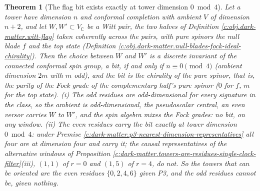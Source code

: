 \documentclass[11pt]{article}
\newtheorem{theorem}{Theorem}[section]
\theoremstyle{definition}
\theoremstyle{plain}
\providecommand{\C}{}\renewcommand{\C}{\mathbb{C}}
\begin{document}
\begin{theorem}[The flag bit exists exactly at tower dimension $0 \bmod 4$]\label{c:dark-matter.flag-bit-exists-exactly-tower-dimension}
Let a tower have dimension $n$ and conformal completion with ambient $V$ of dimension $n + 2$, and let $W, W' \subset V_{\C}$ be a Witt pair, the two halves of Definition \ref{c:obj.dark-matter.witt-flag} taken coherently across the pairs, with pure spinors the null blade $f$ and the top state (Definition \ref{c:obj.dark-matter.null-blades-fock-ideal-chirality}). Then the choice between $W$ and $W'$ is a discrete invariant of the connected conformal spin group, a \emph{bit}, if and only if $n \equiv 0 \pmod 4$ (ambient dimension $2m$ with $m$ odd), and the bit is the chirality of the pure spinor, that is, the parity of the Fock grade of the complementary half's pure spinor ($0$ for $f$, $m$ for the top state). (i) The odd residues are odd-dimensional for every signature in the class, so the ambient is odd-dimensional, the pseudoscalar central, an even versor carries $W$ to $W'$, and the spin algebra mixes the Fock grades: no bit, on any window. (ii) The even residues carry the bit exactly at tower dimension $0 \bmod 4$: under Premise \ref{c:dark-matter.p3-nearest-dimension-representatives} all four are at dimension four and carry it; the causal representatives of the alternative windows of Proposition \ref{c:dark-matter.towers-are-residues-single-clock-filter}(iii), $(1,1)$ of $r = 0$ and $(1,5)$ of $r = 4$, do not. So the towers that can be oriented are the even residues $\{0, 2, 4, 6\}$ given P3, and the odd residues cannot be, given nothing.
\end{theorem}
\end{document}
